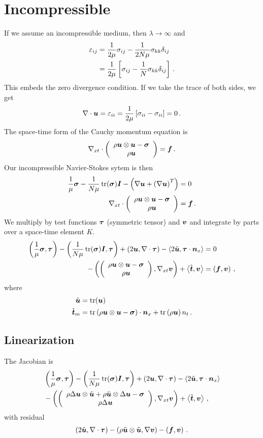 \documentclass{article}
\begin{document}
\section*{Incompressible}
If we assume an incompressible medium, then $\lambda\rightarrow\infty$ and
\begin{align*}
  \varepsilon_{ij}&=\frac{1}{2\mu}\sigma_{ij}-\frac{1}{2N\mu}\sigma_{kk}\delta_{ij}\\
  &=\frac{1}{2\mu}\LRs{\sigma_{ij}-\frac{1}{N}\sigma_{kk}\delta_{ij}}\,.
\end{align*}
This embeds the zero divergence condition. If we take the trace of both sides, we get
\begin{align*}
  \Div\bfu=\varepsilon_{ii}=\frac{1}{2\mu}\LRs{\sigma_{ii}-\sigma_{ii}}=0\,.
\end{align*}
The space-time form of the Cauchy momentum equation is
\begin{equation*}
\Divxt\vecttwo{\rho\bfu\otimes\bfu-\bfsigma}{\rho\bfu}=\bff\,.
\end{equation*}
Our incompressible Navier-Stokes sytem is then
\begin{align*}
\frac{1}{\mu}\bfsigma-\frac{1}{N\mu}\trace(\bfsigma)\bfI-\LRp{\Grad\bfu+\LRp{\Grad\bfu}^T}&=0\\
\Divxt\vecttwo{\rho\bfu\otimes\bfu-\bfsigma}{\rho\bfu}&=\bff\,.
\end{align*}
We multiply by test functions $\bftau$ (symmetric tensor) and $\bfv$ and integrate by parts over a space-time element $K$.
\begin{align*}
\LRp{\frac{1}{\mu}\bfsigma,\bftau}-\LRp{\frac{1}{N\mu}\trace(\bfsigma)\bfI,\bftau}+\LRp{2\bfu,\Div\bftau}-\LRa{2\hat\bfu,\bftau\cdot\bfn_x}&=0\\
-\LRp{\vecttwo{\rho\bfu\otimes\bfu-\bfsigma}{\rho\bfu},\Gradxt\bfv}+\LRa{\hat\bft,\bfv}&=\LRp{\bff,\bfv}\,,
\end{align*}
where 
\begin{equation*}
\begin{aligned}
\hat\bfu&=\trace(\bfu)\\
\hat\bft_m&=\trace\LRp{\rho\bfu\otimes\bfu-\bfsigma}\cdot\bfn_x
+\trace\LRp{\rho\bfu} n_t\,.
\end{aligned}
\end{equation*}

\subsection*{Linearization}
The Jacobian is
\begin{align*}
&\LRp{\frac{1}{\mu}\bfsigma,\bftau}-\LRp{\frac{1}{N\mu}\trace(\bfsigma)\bfI,\bftau}+\LRp{2\bfu,\Div\bftau}-\LRa{2\hat\bfu,\bftau\cdot\bfn_x}\\
&-\LRp{\vecttwo{\rho\Delta\bfu\otimes\tilde\bfu+\rho\tilde\bfu\otimes\Delta\bfu-\bfsigma}{\rho\Delta\bfu},\Gradxt\bfv}+\LRa{\hat\bft,\bfv}\,,
\end{align*}
with residual
\begin{align*}
\LRp{2\tilde\bfu,\Div\bftau}
-\LRp{\rho\tilde\bfu\otimes\tilde\bfu,\Grad\bfv}-\LRp{\bff,\bfv}\,.
\end{align*}
\end{document}
